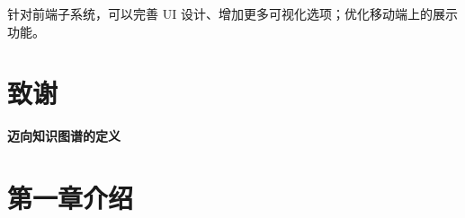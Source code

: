 \documentclass[a4paper,AutoFakeBold,oneside,12pt]{book}
\begin{document}
针对前端子系统，可以完善 UI 设计、增加更多可视化选项；优化移动端上的展示功能。


\begin{nopagenumber}
	\clearpage{}
	

	\clearpage
	\chapter{致\qquad{}谢}
	\normalsize\thankwords

	\newpage\backmatter

	\blankmatter
	\thispagestyle{empty}
	\begin{center}
		
		
	\end{center}

	\setcounter{chapter}{0}
	\renewcommand{\thefigure}{~外\arabic{chapter}-\arabic{figure}~}
	\renewcommand{\theequation}{~外\arabic{chapter}-\arabic{equation}~}
	\renewcommand{\thetable}{~外\arabic{chapter}-\arabic{table}~}

	\begin{center}
	\end{center}
	\vspace{8mm}
	\thispagestyle{empty}


	\begin{center}
		\sanhao\heiti\textbf{迈向知识图谱的定义}

		\xiaosihao{}

		\xiaosihao{}
	\end{center}

	\songti{}
	\begingroup %
	\let\clearpage\relax
	\let\cleardoublepage\relax

	\chapter*{第一章\quad{}介绍}
	\newtranschapter


\end{nopagenumber}
\end{document}
